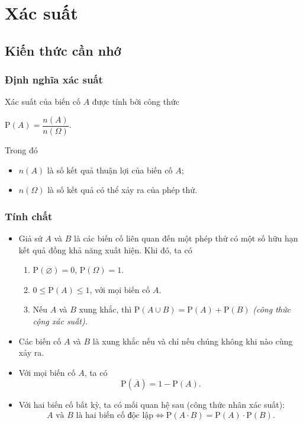 \setcounter{ex}{0}
\section{Xác suất}
\subsection{Kiến thức cần nhớ}
\begin{khung}
	\subsubsection{Định nghĩa xác suất}
	Xác suất của biến cố $A$ được tính bởi công thức
\begin{center}
	$\mathrm{P}(A)=\dfrac{n(A)}{n(\Omega)}$.
\end{center}
Trong đó 
\begin{itemize}
	\item $n(A)$ là số kết quả thuận lợi của biến cố $A$;
	\item $n(\Omega)$ là số kết quả có thể xảy ra của phép thử.
\end{itemize}
	\subsubsection{Tính chất}
	\begin{itemize}
		\item Giả sử $A$ và $B$ là các biến cố liên quan đến một phép thử có một số hữu hạn kết quả đồng khả năng xuất hiện. Khi đó, ta có
		\begin{enumerate}
			\item $\mathrm{P}(\varnothing)=0$, $\mathrm{P}(\Omega)=1$.
			\item $0\le \mathrm{P}(A)\le 1$, với mọi biến cố $A$.
			\item Nếu $A$ và $B$ xung khắc, thì
			$\mathrm{P}(A\cup B)=\mathrm{P}(A)+\mathrm{P}(B)$
			 \textit{(công thức cộng xác suất).}
		\end{enumerate}
	\item Các biến cố $A$ và $B$ là xung khắc nếu và chỉ nếu chúng không khi nào cùng xảy ra.
	\item Với mọi biến cố $A$, ta có 
	$$\mathrm{P}\left(\overline{A}\right)=1-\mathrm{P}(A).$$
	\item Với hai biến cố bất kỳ, ta có mối quan hệ sau (công thức nhân xác suất):
	$$A \text{ và } B \text{ là hai biến cố độc lập}\Leftrightarrow \mathrm{P}(A\cdot B)=\mathrm{P}(A)\cdot \mathrm{P}(B).$$
	
	\end{itemize}
\end{khung}

